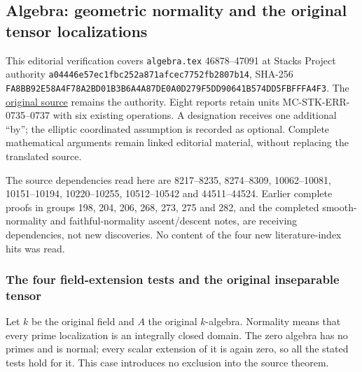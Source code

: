 \subsection{Algebra: geometric normality and the original tensor localizations}\label{algebra-proof-070-algebra-geometric-normality-and-the-original-tensor-localizations}

This editorial verification covers \texttt{algebra.tex} 46878--47091 at Stacks Project authority \texttt{a044\allowbreak{}46e5\allowbreak{}7ec1\allowbreak{}fbc2\allowbreak{}52a8\allowbreak{}71af\allowbreak{}cec7\allowbreak{}752f\allowbreak{}b280\allowbreak{}7b14}, SHA-256 \texttt{FA8B\allowbreak{}B92E\allowbreak{}58A4\allowbreak{}F78A\allowbreak{}2BD0\allowbreak{}1B3B\allowbreak{}6A4A\allowbreak{}87DE\allowbreak{}0A0D\allowbreak{}279F\allowbreak{}5DD9\allowbreak{}0641\allowbreak{}B574\allowbreak{}DD5F\allowbreak{}BFFF\allowbreak{}A4F3}. The \href{https://github.com/stacks/stacks-project/blob/a04446e57ec1fbc252a871afcec7752fb2807b14/algebra.tex\#L46878}{original source} remains the authority. Eight reports retain units MC-\AlgebraIdentifierBreak{}STK-\AlgebraIdentifierBreak{}ERR-\AlgebraIdentifierBreak{}0735--\AlgebraIdentifierBreak{}0737 with six existing operations. A designation receives one additional ``by''; the elliptic coordinated assumption is recorded as optional. Complete mathematical arguments remain linked editorial material, without replacing the translated source.

The source dependencies read here are 8217--8235, 8274--8309, 10062--10081, 10151--10194, 10220--10255, 10512--10542 and 44511--44524. Earlier complete proofs in groups 198, 204, 206, 268, 273, 275 and 282, and the completed smooth-normality and faithful-normality ascent/descent notes, are receiving dependencies, not new discoveries. No content of the four new literature-index hits was read.

\subsubsection{The four field-extension tests and the original inseparable tensor}\label{algebra-proof-070-the-four-field-extension-tests-and-the-original-inseparable-tensor}

Let \(k\) be the original field and \(A\) the original \(k\)-algebra. Normality means that every prime localization is an integrally closed domain. The zero algebra has no primes and is normal; every scalar extension of it is again zero, so all the stated tests hold for it. This case introduces no exclusion into the source theorem.

